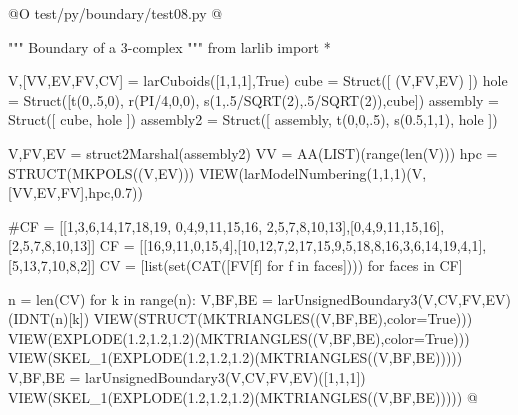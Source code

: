 \documentclass[11pt,oneside]{article}	%
\begin{document}
@O test/py/boundary/test08.py
@{""" Boundary of a 3-complex """
from larlib import *

V,[VV,EV,FV,CV] = larCuboids([1,1,1],True)
cube = Struct([ (V,FV,EV) ])
hole = Struct([t(0,.5,0), r(PI/4,0,0), s(1,.5/SQRT(2),.5/SQRT(2)),cube])
assembly = Struct([ cube, hole ])
assembly2 = Struct([ assembly, t(0,0,.5), s(0.5,1,1), hole ])

V,FV,EV = struct2Marshal(assembly2) 
VV = AA(LIST)(range(len(V)))
hpc = STRUCT(MKPOLS((V,EV)))
VIEW(larModelNumbering(1,1,1)(V,[VV,EV,FV],hpc,0.7))

#CF = [[1,3,6,14,17,18,19, 0,4,9,11,15,16, 2,5,7,8,10,13],[0,4,9,11,15,16],[2,5,7,8,10,13]]
CF = [[16,9,11,0,15,4],[10,12,7,2,17,15,9,5,18,8,16,3,6,14,19,4,1],[5,13,7,10,8,2]]
CV = [list(set(CAT([FV[f]  for f in faces]))) for faces in CF]

n = len(CV)
for k in range(n): 
    V,BF,BE = larUnsignedBoundary3(V,CV,FV,EV)(IDNT(n)[k])
    VIEW(STRUCT(MKTRIANGLES((V,BF,BE),color=True))) 
    VIEW(EXPLODE(1.2,1.2,1.2)(MKTRIANGLES((V,BF,BE),color=True))) 
    VIEW(SKEL_1(EXPLODE(1.2,1.2,1.2)(MKTRIANGLES((V,BF,BE)))))
V,BF,BE = larUnsignedBoundary3(V,CV,FV,EV)([1,1,1])
VIEW(SKEL_1(EXPLODE(1.2,1.2,1.2)(MKTRIANGLES((V,BF,BE)))))
@}
\end{document}
